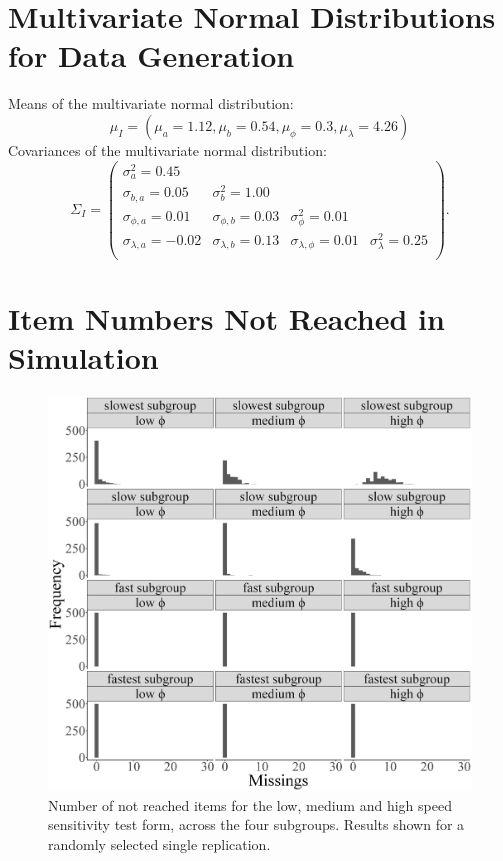 \documentclass[a4paper,man,apacite,donotrepeattitle]{apa6}
\begin{document}
\section{Multivariate Normal Distributions for Data Generation}
Means of the multivariate normal distribution:
\begin{equation}
	\mu_{I} = (\mu_{a} = 1.12, \mu_{b} = 0.54, \mu_{\phi} = 0.3, \mu_{\lambda} = 4.26)
\end{equation}
Covariances of the multivariate normal distribution:
\begin{equation}
	\Sigma_I =	\begin{pmatrix}
\sigma^2_{a} = 0.45 &  &  &  \\
\sigma_{b, a} = 0.05 & \sigma^2_{b} = 1.00 &  &  \\
\sigma_{\phi, a} = 0.01 & \sigma_{\phi, b} = 0.03 & \sigma_{\phi}^2 = 0.01 &  \\
\sigma_{\lambda, a} = -0.02 & \sigma_{\lambda, b} = 0.13 & \sigma_{\lambda, \phi} = 0.01 & \sigma^2_{\lambda} = 0.25 \\
	\end{pmatrix}.	
\end{equation}

\section{Item Numbers Not Reached in Simulation}
\begin{figure}
	\begin{center}
		\includegraphics[height = 0.4\textheight]{miss_subGroup.eps}
	\end{center}
		\caption{Number of not reached items for the low, medium and high speed sensitivity test form, across the four subgroups. Results shown for a randomly selected single replication.}	
		\label{fig:miss}
\end{figure}
\end{document}
